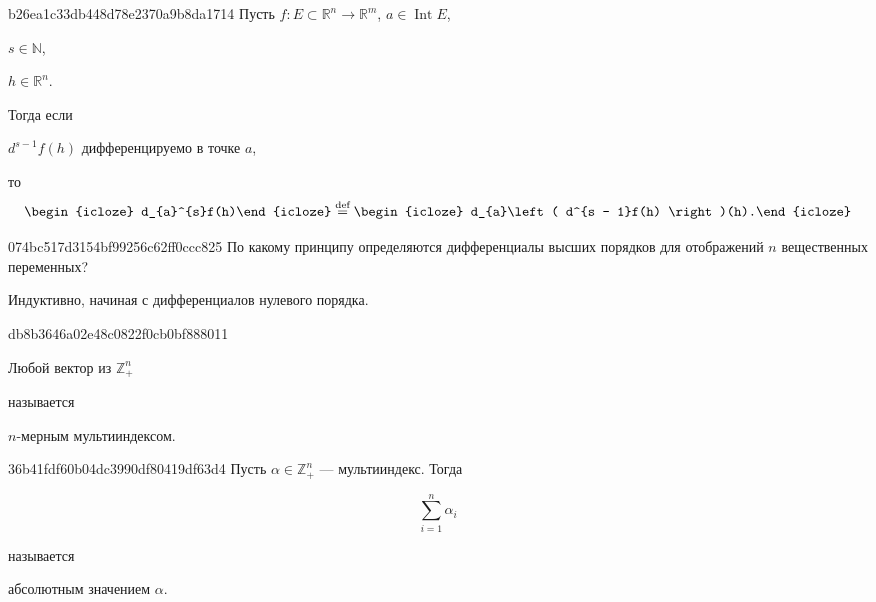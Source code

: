 \begin{note}{b26ea1c33db448d78e2370a9b8da1714}
    Пусть \({ f : E \subset \mathbb R^{n} \to \mathbb R^{m} }\),\: \({ a \in \operatorname{Int} E }\),\: \begin{icloze}{5}\({ s \in \mathbb N }\),\end{icloze}\: \begin{icloze}{4}\({ h \in \mathbb R^{n} }\).\end{icloze}
    Тогда если \begin{icloze}{2}\({ d^{s - 1}f(h) }\) дифференцируемо в точке \({ a }\),\end{icloze} то
    \[
        \begin{icloze}{3}d_{a}^{s}f(h)\end{icloze} \overset{\text{def}}= \begin{icloze}{1}d_{a}\left( d^{s - 1}f(h) \right)(h).\end{icloze}
    \]
\end{note}

\begin{note}{074bc517d3154bf99256c62ff0ccc825}
    По какому принципу определяются дифференциалы высших порядков для отображений \({ n }\) вещественных переменных?

    \begin{cloze}{1}
        Индуктивно, начиная с дифференциалов нулевого порядка.
    \end{cloze}
\end{note}

\begin{note}{db8b3646a02e48c0822f0cb0bf888011}
    \begin{icloze}{1}Любой вектор из \({ \mathbb Z_+^{n} }\)\end{icloze} называется \begin{icloze}{2}\({ n }\)-мерным мультииндексом.\end{icloze}
\end{note}

\begin{note}{36b41fdf60b04dc3990df80419df63d4}
    Пусть \({ \alpha \in \mathbb Z_+^{n} }\) --- мультииндекс.
    Тогда
    \begin{icloze}{1}
        \[
            \sum_{i=1}^{n} \alpha_i
        \]
    \end{icloze}
    называется \begin{icloze}{2}абсолютным значением \({ \alpha }\).\end{icloze}
\end{note}

